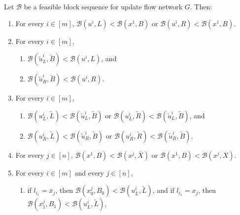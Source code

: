 \documentclass[fontsize=11pt,paper=a4]{book}
\begin{document}
\begin{lem}
Let \(\mathcal{B}\) be a feasible block sequence for update flow network \(G\).
Then:

\begin{enumerate}
\item \label{itm:lem-feasible-block-sequence-properties-1}
For every \(i\in[m]\), \(\mathcal{B}(u^i,L)<\mathcal{B}(x^1,B)\) or \(\mathcal{B}(u^i,R)<\mathcal{B}(x^1,B)\).

\item \label{itm:lem-feasible-block-sequence-properties-2}
For every \(i\in[m]\),

\begin{enumerate}
\item \label{itm:lem-feasible-block-sequence-properties-2-1}
\(\mathcal{B}(\tilde{u}_L^i,\tilde{B})<\mathcal{B}(u^i,L)\), and

\item \label{itm:lem-feasible-block-sequence-properties-2-2}
\(\mathcal{B}(\tilde{u}_R^i,\tilde{B})<\mathcal{B}(u^i,R)\).
\end{enumerate}

\item \label{itm:lem-feasible-block-sequence-properties-3}
For every \(i\in[m]\),

\begin{enumerate}
\item \label{itm:lem-feasible-block-sequence-properties-3-1}
\(\mathcal{B}(u_L^i,\tilde{L})<\mathcal{B}(\tilde{u}_L^i,\tilde{B})\) or \(\mathcal{B}(u_L^i,\tilde{R})<\mathcal{B}(\tilde{u}_L^i,\tilde{B})\), and

\item \label{itm:lem-feasible-block-sequence-properties-3-2}
\(\mathcal{B}(u_R^i,\tilde{L})<\mathcal{B}(\tilde{u}_R^i,\tilde{B})\) or \(\mathcal{B}(u_R^i,\tilde{R})<\mathcal{B}(\tilde{u}_R^i,\tilde{B})\).
\end{enumerate}

\item \label{itm:lem-feasible-block-sequence-properties-4}
For every \(j\in[n]\), \(\mathcal{B}(x^1,B)<\mathcal{B}(x^j,\bar{X})\) or \(\mathcal{B}(x^1,B)<\mathcal{B}(x^j,X)\).

\item \label{itm:lem-feasible-block-sequence-properties-5}
For every \(i\in[m]\) and every \(j\in[n]\),

\begin{enumerate}
\item \label{itm:lem-feasible-block-sequence-properties-5-1}
if \(l_{i_1}=\bar{x}_j\), then \(\mathcal{B}(x_0^j,B_0)<\mathcal{B}(u_L^i,\tilde{L})\), and if \(l_{i_1}=x_j\), then \(\mathcal{B}(x_1^j,B_1)<\mathcal{B}(u_L^i,\tilde{L})\),


\end{enumerate}
\end{enumerate}
\end{lem}
\end{document}
